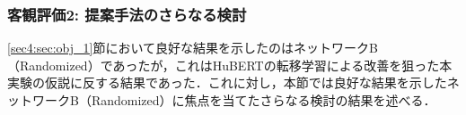 \begin{table}[bt]
    \centering
    \caption{最適な$\lossWeightHubDisc$における手法ごとの比較}
    \label{sec4:tab:obj_method_comp}
    \begin{center}
        \renewcommand{\arraystretch}{1.0} %
        \setlength{\tabcolsep}{8pt}      %
    \end{center}
\end{table}

\clearpage

\subsubsection{客観評価2: 提案手法のさらなる検討}
\label{sec4:sec:obj_2}
\ref{sec4:sec:obj_1}節において良好な結果を示したのはネットワークB（Randomized）であったが，これはHuBERTの転移学習による改善を狙った本実験の仮説に反する結果であった．これに対し，本節では良好な結果を示したネットワークB（Randomized）に焦点を当てたさらなる検討の結果を述べる．

